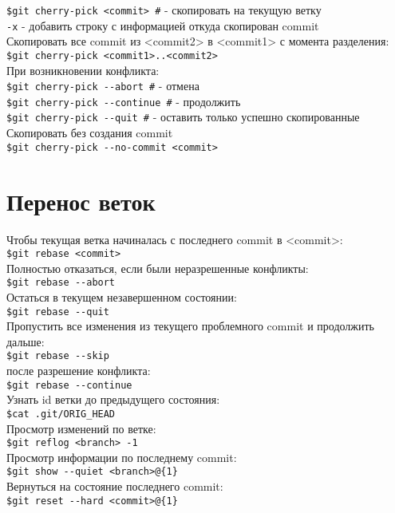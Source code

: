 \documentclass[12pt, a4paper]{article}
\begin{document}
\texttt{\$git cherry-pick <commit> \indent\#} - скопировать на текущую ветку \\
\indent\texttt{-x} - добавить строку с информацией откуда скопирован commit \\

\noindent Скопировать все commit из <commit2> в <commit1> с момента разделения: \\
\indent\texttt{\$git cherry-pick <commit1>..<commit2>}\\

\noindent При возникновении конфликта: \\
\indent\texttt{\$git cherry-pick {-}-abort \indent\#} - отмена \\
\indent\texttt{\$git cherry-pick {-}-continue \indent\#} - продолжить \\
\indent\texttt{\$git cherry-pick {-}-quit \indent\#} - оставить только успешно скопированные \\

\noindent Скопировать без создания commit \\
\indent\texttt{\$git cherry-pick {-}-no-commit <commit>} \\



\section{Перенос веток}

Чтобы текущая ветка начиналась с последнего commit в <commit>: \\
\indent\texttt{\$git rebase <commit>} \\
Полностью отказаться, если были неразрешенные конфликты: \\
\indent\texttt{\$git rebase {-}-abort} \\
Остаться в текущем незавершенном состоянии: \\
\indent\texttt{\$git rebase {-}-quit}  \\
Пропустить все изменения из текущего проблемного commit и продолжить дальше: \\
\indent\texttt{\$git rebase {-}-skip } \\


 после разрешение конфликта: \\
\indent\texttt{\$git rebase {-}-continue } \\
Узнать id ветки до предыдущего состояния: \\ 
\indent\texttt{\$cat .git/ORIG\_HEAD } \\
Просмотр изменений по ветке: \\
\indent\texttt{\$git reflog <branch> -1}  \\
Просмотр информации по последнему commit: \\
\indent\texttt{\$git show {-}-quiet <branch>{@}\{1\}} \\ 
Вернуться на состояние последнего commit: \\
\indent\texttt{\$git reset {-}-hard <commit>{@}\{1\}} \\ 
\end{document}
